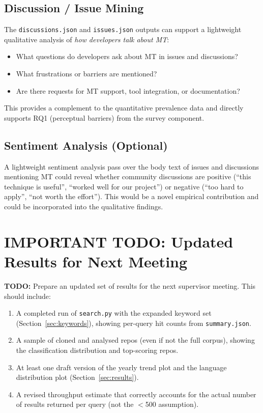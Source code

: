 \documentclass[12pt,a4paper]{article}
\newenvironment{todo}{\begin{mdframed}[linecolor=todocolor,linewidth=1pt]\textbf{\color{todocolor}TODO: }}{\end{mdframed}}
\begin{document}
\subsection{Discussion / Issue Mining}

The \texttt{discussions.json} and \texttt{issues.json} outputs can support a
lightweight qualitative analysis of \emph{how developers talk about MT}:
\begin{itemize}
  \item What questions do developers ask about MT in issues and discussions?
  \item What frustrations or barriers are mentioned?
  \item Are there requests for MT support, tool integration, or documentation?
\end{itemize}
This provides a complement to the quantitative prevalence data and directly
supports RQ1 (perceptual barriers) from the survey component.

\subsection{Sentiment Analysis (Optional)}

A lightweight sentiment analysis pass over the body text of issues and
discussions mentioning MT could reveal whether community discussions are
positive (``this technique is useful'', ``worked well for our project'') or
negative (``too hard to apply'', ``not worth the effort''). This would be a
novel empirical contribution and could be incorporated into the qualitative
findings.

\section{IMPORTANT TODO: Updated Results for Next Meeting}

\begin{todo}
Prepare an updated set of results for the next supervisor meeting. This should
include:
\begin{enumerate}
  \item A completed run of \texttt{search.py} with the expanded keyword set
        (Section~\ref{sec:keywords}), showing per-query hit counts from
        \texttt{summary.json}.
  \item A sample of cloned and analysed repos (even if not the full corpus),
        showing the classification distribution and top-scoring repos.
  \item At least one draft version of the yearly trend plot and the language
        distribution plot (Section~\ref{sec:results}).
  \item A revised throughput estimate that correctly accounts for the actual
        number of results returned per query (not the $<$500 assumption).
\end{enumerate}
\end{todo}
\end{document}
